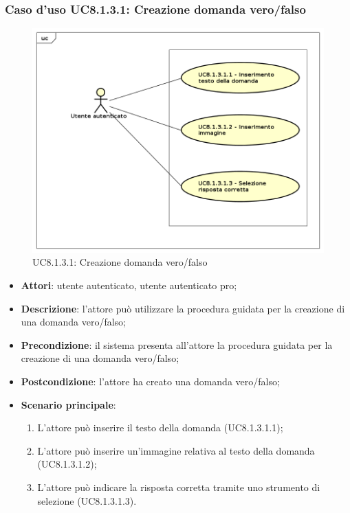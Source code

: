 \subsubsection{Caso d'uso UC8.1.3.1: Creazione domanda vero/falso}
	\label{UC8.1.3.1}
	\begin{figure}[h]
		\centering
			\includegraphics[scale=0.45,keepaspectratio]{UML/UC8_1_3_1.png}
		\caption{UC8.1.3.1: Creazione domanda vero/falso}
	\end{figure}
	\FloatBarrier
	\begin{itemize}
		\item
			\textbf{Attori}: utente autenticato, utente autenticato pro;
		\item		
			\textbf{Descrizione}: l'attore può utilizzare la procedura guidata per la creazione di una domanda vero/falso;
		\item
			\textbf{Precondizione}: il sistema presenta all'attore la procedura guidata per la creazione di una domanda vero/falso; 
		\item
			\textbf{Postcondizione}: l'attore ha creato una domanda vero/falso;
		\item
			\textbf{Scenario principale}:
	       		\begin{enumerate}
	       			\item
	       			L'attore può inserire il testo della domanda (UC8.1.3.1.1);
	       			\item
	       			L'attore può inserire un'immagine relativa al testo della domanda (UC8.1.3.1.2);
					\item
					L'attore può indicare la risposta corretta tramite uno strumento di selezione (UC8.1.3.1.3).
	 			\end{enumerate}
	\end{itemize}

